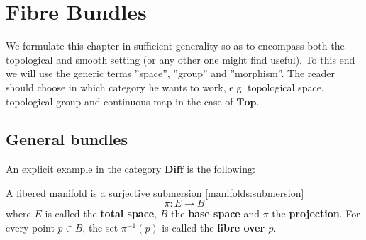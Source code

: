 \chapter{Fibre Bundles}\label{chapter:bundles}

    We formulate this chapter in sufficient generality so as to encompass both the topological and smooth setting (or any other one might find useful). To this end we will use the generic terms ''space'', ''group'' and ''morphism''. The reader should choose in which category he wants to work, e.g. topological space, topological group and continuous map in the case of $\mathbf{Top}$.

\section{General bundles}


    An explicit example in the category $\mathbf{Diff}$ is the following:
    \begin{example}
        A fibered manifold is a surjective submersion \ref{manifolds:submersion} \[\pi:E\rightarrow B\] where $E$ is called the \textbf{total space}, $B$ the \textbf{base space} and $\pi$ the \textbf{projection}. For every point $p\in B$, the set $\pi^{-1}(p)$ is called the \textbf{fibre over $p$}.
    \end{example}

